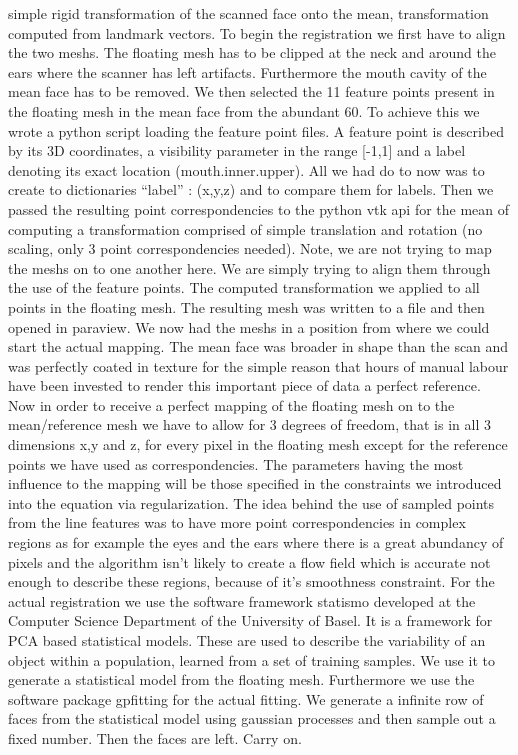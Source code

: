 simple rigid transformation of the scanned face onto the mean, transformation computed from landmark vectors.
To begin the registration we first have to align the two meshs. The floating mesh has to be clipped at the neck and around the ears where the scanner has left artifacts. Furthermore the mouth cavity of the mean face has to be removed. We then selected the 11 feature points present in the floating mesh in the mean face from the abundant 60. To achieve this we wrote a python script loading the feature point files. A feature point is described by its 3D coordinates, a visibility parameter
in the range [-1,1] and a label denoting its exact location (mouth.inner.upper). All we had do to now was to create to dictionaries “label” : (x,y,z) and to compare them for labels. Then we passed the resulting point correspondencies to the python vtk api for the mean of computing a transformation comprised of simple translation and rotation (no scaling, only 3 point correspondencies needed). Note, we are not trying to map the meshs on to one another here. We are simply trying to
    align them through the use of the feature points. The computed transformation we applied to all points in the floating mesh. The resulting mesh was written to a file and then opened in paraview. We now had the meshs in a position from where we could start the actual mapping. The mean face was broader in shape than the scan and was perfectly coated in texture for the simple reason that hours of manual labour have been invested to render this important piece of data a perfect
    reference.
    Now in order to receive a perfect mapping of the floating mesh on to the mean/reference mesh we have to allow for 3 degrees of freedom, that is in all 3 dimensions x,y and z, for every pixel in the floating mesh except for the reference points we have used as correspondencies. The parameters having the most influence to the mapping will be those specified in the constraints we introduced into the equation via regularization. The idea behind the use of sampled points from
    the line features was to have more point correspondencies in complex regions as for example the eyes and the ears where there is a great abundancy of pixels and the algorithm isn’t likely to create a flow field which is accurate not enough to describe these regions, because of it’s smoothness constraint.
    For the actual registration we use the software framework statismo developed at the Computer Science Department of the University of Basel. It is a framework for PCA based statistical models. These are used to describe the variability of an object within a population, learned from a set of training samples. We use it to generate a statistical model from the floating mesh. Furthermore we use the software package gpfitting for the actual fitting. We generate a infinite row of
    faces from the statistical model using gaussian processes and then sample out a fixed number. Then the faces are left. Carry on.

